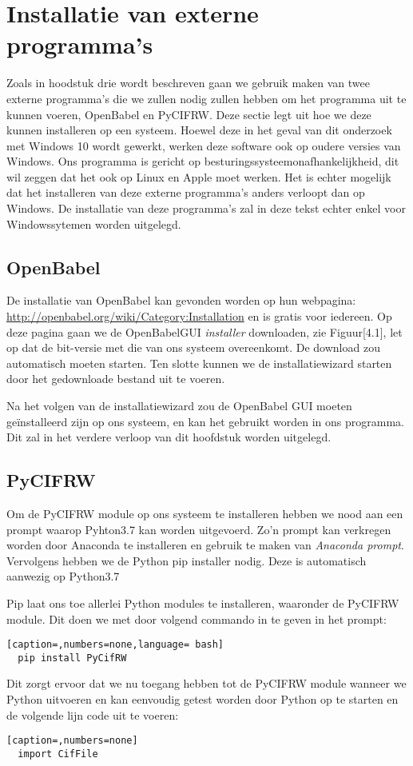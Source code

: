 \section{Installatie van externe programma's}
Zoals in hoodstuk drie wordt beschreven gaan we gebruik maken van twee externe programma's die we zullen nodig zullen hebben om het programma uit te kunnen voeren, OpenBabel en PyCIFRW. Deze sectie legt uit hoe we deze kunnen installeren op een systeem. Hoewel deze in het geval van dit onderzoek met Windows 10 wordt gewerkt, werken deze software ook op oudere versies van Windows. Ons programma is gericht op besturingssysteemonafhankelijkheid, dit wil zeggen dat het ook op Linux en Apple moet werken. Het is echter mogelijk dat het installeren van deze externe programma's anders verloopt dan op Windows. De installatie van deze programma's zal in deze tekst echter enkel voor Windowssytemen worden uitgelegd.

\subsection{OpenBabel}  
De installatie van OpenBabel kan gevonden worden op hun webpagina: \url{http://openbabel.org/wiki/Category:Installation} en is gratis voor iedereen. Op deze pagina gaan we de OpenBabelGUI \textit{installer} downloaden, zie Figuur[4.1], let op dat de bit-versie met die van ons systeem overeenkomt. De download zou automatisch moeten starten. Ten slotte kunnen we de installatiewizard starten door het gedownloade bestand uit te voeren.
\par
Na het volgen van de installatiewizard zou de OpenBabel GUI moeten geïnstalleerd zijn op ons systeem, en kan het gebruikt worden in ons programma. Dit zal in het verdere verloop van dit hoofdstuk worden uitgelegd.

\subsection{PyCIFRW}
Om de PyCIFRW module op ons systeem te installeren hebben we nood aan een prompt waarop Pyhton3.7 kan worden uitgevoerd. Zo'n prompt kan verkregen worden door Anaconda te installeren en gebruik te maken van \textit{Anaconda prompt}. Vervolgens hebben we de Python pip installer nodig. Deze is automatisch aanwezig op Python3.7
\par 
Pip laat ons toe allerlei Python modules te installeren, waaronder de PyCIFRW module. Dit doen we met door volgend commando in te geven in het prompt:
\begin{lstlisting}[caption=,numbers=none,language= bash]
  pip install PyCifRW
\end{lstlisting}
Dit zorgt ervoor dat we nu toegang hebben tot de PyCIFRW module wanneer we Python uitvoeren en kan eenvoudig getest worden door Python op te starten en de volgende lijn code uit te voeren:
\begin{lstlisting}[caption=,numbers=none]
  import CifFile
\end{lstlisting}

